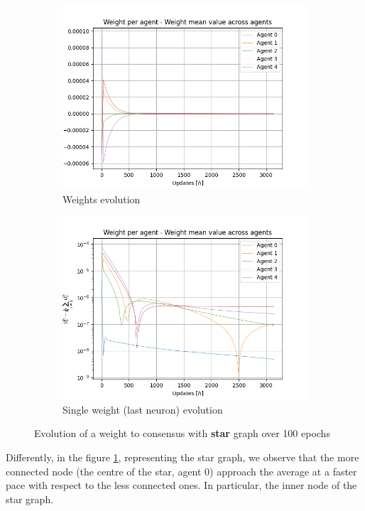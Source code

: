 \documentclass[a4paper,11pt,oneside]{book}
\begin{document}
\begin{figure}[h]
\centering
	\begin{subfigure}{0.49\textwidth}	
	\includegraphics[width=\textwidth]{star/weight_100}
	\caption{Weights evolution}
	\end{subfigure}
\hfill
	\begin{subfigure}{0.49\textwidth}	
	\includegraphics[width=\textwidth]{star/weight_100_log}
	\caption{Single weight (last neuron) evolution}
	\end{subfigure}
\caption{Evolution of a weight to consensus with \textbf{star} graph over 100 epochs}
\label{star_test}
\end{figure}

Differently, in the figure \ref{star_test}, representing the star graph, we observe that the more connected node (the centre of the star, agent 0) approach the average at a faster pace with respect to the less connected ones. In particular, the inner node of the star graph.
\end{document}
